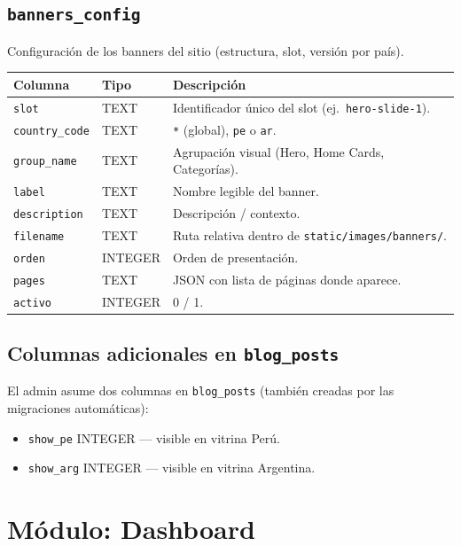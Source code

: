 \documentclass[11pt,a4paper]{article}
\begin{document}
\subsection{\texttt{banners\_config}}
Configuración de los banners del sitio (estructura, slot, versión por
país).

\begin{longtable}{p{3.5cm} p{2cm} p{8cm}}
\toprule
\textbf{Columna} & \textbf{Tipo} & \textbf{Descripción} \\
\midrule
\endhead
\texttt{slot}          & TEXT       & Identificador único del slot (ej.\ \texttt{hero-slide-1}). \\
\texttt{country\_code} & TEXT       & \texttt{*} (global), \texttt{pe} o \texttt{ar}. \\
\texttt{group\_name}   & TEXT       & Agrupación visual (Hero, Home Cards, Categorías). \\
\texttt{label}         & TEXT       & Nombre legible del banner. \\
\texttt{description}   & TEXT       & Descripción / contexto. \\
\texttt{filename}      & TEXT       & Ruta relativa dentro de \texttt{static/images/banners/}. \\
\texttt{orden}         & INTEGER    & Orden de presentación. \\
\texttt{pages}         & TEXT       & JSON con lista de páginas donde aparece. \\
\texttt{activo}        & INTEGER    & 0 / 1. \\
\bottomrule
\end{longtable}

\subsection{Columnas adicionales en \texttt{blog\_posts}}
El admin asume dos columnas en \texttt{blog\_posts} (también creadas por
las migraciones automáticas):

\begin{itemize}[leftmargin=*]
    \item \texttt{show\_pe} INTEGER --- visible en vitrina Perú.
    \item \texttt{show\_arg} INTEGER --- visible en vitrina Argentina.
\end{itemize}

\section{Módulo: Dashboard}
\end{document}
